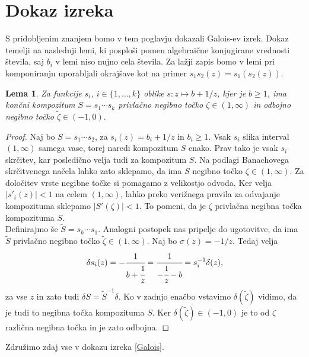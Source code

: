 \documentclass[a4paper,12pt]{article}
\newtheorem{lema}{Lema}
\newenvironment{dokaz}[1][Dokaz]{\begin{proof}}{\end{proof}}
\begin{document}

\section{Dokaz izreka}

S pridobljenim znanjem bomo v tem poglavju dokazali Galois-ev izrek. Dokaz temelji na naslednji lemi, ki posploši pomen algebraične konjugirane vrednosti števila, saj $b_i$ v lemi niso nujno cela števila. Za lažji zapis bomo v lemi pri komponiranju uporabljali okrajšave kot na primer $s_1s_2(z) = s_1(s_2(z)).$

\begin{lema}
    Za funkcije $s_i$, $i \in \{1, \ldots, k\}$ oblike $s : z \mapsto b + 1/z$, kjer je $b \geq 1$, ima končni kompozitum $S = s_1 \cdots s_k$ privlačno negibno točko $\zeta \in (1, \infty)$ in odbojno negibno točko $\tilde{\zeta} \in (-1, 0).$ 
\end{lema}
\begin{dokaz}
    Naj bo $S = s_1 \cdots s_2$, za $s_i(z) = b_i + 1/z$ in $b_i \geq 1$. Vsak $s_i$ slika interval $(1, \infty)$ samega vase, torej naredi kompozitum $S$ enako. Prav tako je vsak $s_i$ skrčitev, kar posledično velja tudi za kompozitum $S$. Na podlagi Banachovega skrčitvenega načela lahko zato sklepamo, da ima $S$ negibno točko $\zeta \in (1, \infty)$. Za določitev vrste negibne točke si pomagamo z velikostjo odvoda. Ker velja $|s'_i(z)| < 1$ na celem $(1, \infty)$, lahko preko verižnega pravila za odvajanje kompozituma sklepamo $|S'(\zeta)| < 1$. To pomeni, da je $\zeta$ privlačna negibna točka kompozituma $S$.\\
    Definirajmo še $\tilde{S} = s_k \cdots s_1$. Analogni postopek nas pripelje do ugotovitve, da ima $\tilde{S}$ privlačno negibno točko $\tilde{\zeta} \in (1, \infty)$. Naj bo $\sigma(z) = -1/z$. Tedaj velja
    \[
        \delta s_i (z) = - \cfrac{1}{b + \cfrac{1}{z}} = \cfrac{1}{-\cfrac{1}{z} - b} = s^{-1}_i \delta (z),
    \]
    za vse $z$ in zato tudi $\delta S = \tilde{S}^{-1} \delta$. Ko v zadnjo enačbo vstavimo $\delta (\tilde{\zeta})$ vidimo, da je tudi to negibna točka kompozituma $S$. Ker $\delta (\tilde{\zeta}) \in (-1, 0)$ je to od $\zeta$ različna negibna točka in je zato odbojna.
\end{dokaz}

Združimo zdaj vse v dokazu izreka \ref{Galois}.
\end{document}
